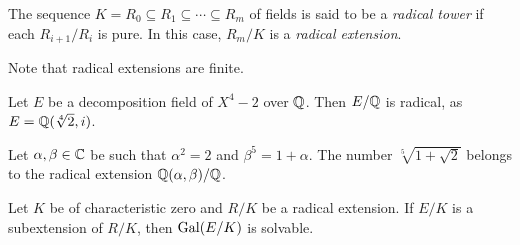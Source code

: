 \begin{definition}
    The sequence $K=R_0\subseteq R_1\subseteq\cdots\subseteq R_m$ 
    of fields is said to be a \emph{radical tower} if 
    each $R_{i+1}/R_i$ is pure. In this case, $R_m/K$ is a \emph{radical extension}. 
\end{definition}

Note that radical extensions are finite. 

\begin{example}
    Let $E$ be a decomposition field of $X^4-2$ over $\mathbb{Q}$. Then $E/\mathbb{Q}$ is radical, 
    as $E=\mathbb{Q}(\sqrt[4]{2},i)$. 
\end{example}

\begin{example}
    Let $\alpha,\beta\in\mathbb{C}$ be such that $\alpha^2=2$ and 
    $\beta^5=1+\alpha$. 
    The number $\sqrt[5]{1+\sqrt{2}}$ belongs to the radical extension $\mathbb{Q}(\alpha,\beta)/\mathbb{Q}$. 
\end{example}

\begin{theorem}
\label{thm:by_radicals}
    Let $K$ be of characteristic zero and 
    $R/K$ be a radical extension. If $E/K$ is a subextension of $R/K$, 
    then $\operatorname{Gal}(E/K)$ is solvable. 
\end{theorem}

